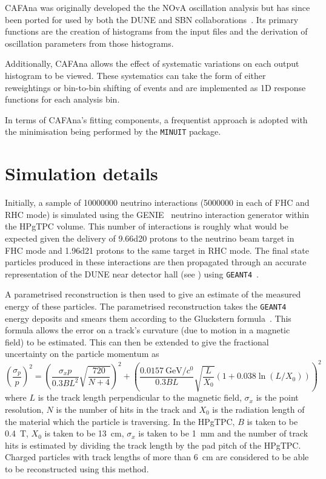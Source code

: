 CAFAna was originally developed the the NOvA oscillation analysis but has since been ported for used by both the DUNE and SBN collaborations~\cite{cafana}.
Its primary functions are the creation of histograms from the input files and the derivation of oscillation parameters from those histograms.

Additionally, CAFAna allows the effect of systematic variations on each output histogram to be viewed. 
These systematics can take the form of either reweightings or bin-to-bin shifting of events and are implemented as 1D response functions for each analysis bin.

In terms of CAFAna's fitting components, a frequentist approach is adopted with the minimisation being performed by the \texttt{MINUIT} package.

\section{Simulation details}
\label{sec:dune_ndrwt:simDetails}

Initially, a sample of \num{10000000} neutrino interactions (\num{5000000} in each of FHC and RHC mode) is simulated using the GENIE~\cite{genie} neutrino interaction generator within the HPgTPC volume.
This number of interactions is roughly what would be expected given the delivery of \num{9.66d20} protons to the neutrino beam target in FHC mode and \num{1.96d21} protons to the same target in RHC mode.
The final state particles produced in these interactions are then propagated through an accurate representation of the DUNE near detector hall (see ) using \texttt{GEANT4}~\cite{geant}. 
 
A parametrised reconstruction is then used to give an estimate of the measured energy of these particles.
The parametrised reconstruction takes the \texttt{GEANT4} energy deposits and smears them according to the Gluckstern formula~\cite{gluckstern}.
This formula allows the error on a track's curvature (due to motion in a magnetic field) to be estimated.
This can then be extended to give the fractional uncertainty on the particle momentum as
\begin{equation}
	\left(\frac{\sigma_{p}}{p}\right)^{2} = \left( \frac{\sigma_{x} p}{0.3 B L^{2}} \sqrt{ \frac{720}{N+4} } \right)^{2} +
	\left( \frac{\SI{0.0157}{\GeV\per\clight}}{0.3BL}\sqrt{\frac{L}{X_{0}}}\left( 1 + 0.038 \ln(L/X_{0}) \right) \right)^{2}
\end{equation}
where $L$ is the track length perpendicular to the magnetic field, $\sigma_{x}$ is the point resolution, $N$ is the number of hits in the track and $X_0$ is the radiation length of the material which the particle is traversing.
In the HPgTPC, $B$ is taken to be \SI{0.4}{\tesla}, $X_{0}$ is taken to be \SI{13}{\cm}, $\sigma_{x}$ is taken to be \SI{1}{\mm} and the number of track hits is estimated by dividing the track length by the pad pitch of the HPgTPC.
Charged particles with track lengths of more than \SI{6}{\cm} are considered to be able to be reconstructed using this method.

